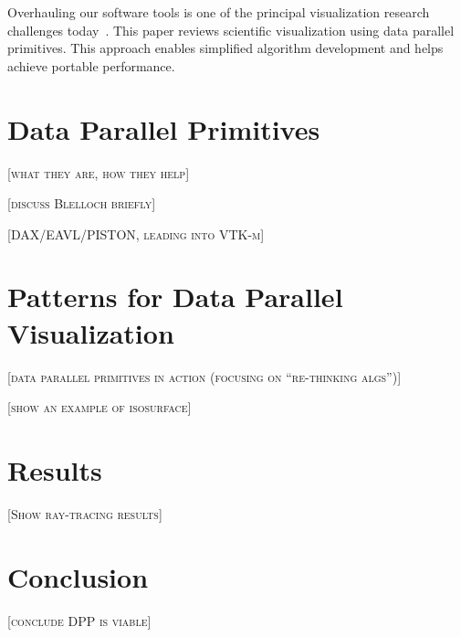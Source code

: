 \documentclass{superfri}
\newcommand*{\lcite}[1]{~\cite{#1}}
\newcommand{\fix}[1]{{\color{red}\textsc{[#1]}}}
\begin{document}
Overhauling our software tools is one of the principal visualization
research challenges today\lcite{Childs2013}. This paper reviews scientific
visualization using data parallel primitives. This approach enables
simplified algorithm development and helps achieve portable performance.


\section{Data Parallel Primitives}

\fix{what they are, how they help}

\fix{discuss Blelloch briefly}

\fix{DAX/EAVL/PISTON, leading into VTK-m}


\section{Patterns for Data Parallel Visualization}

\fix{data parallel primitives in action (focusing on ``re-thinking algs'')}

\fix{show an example of isosurface}


\section{Results}

\fix{Show ray-tracing results}


\section{Conclusion}

\fix{conclude DPP is viable}






\end{document}
